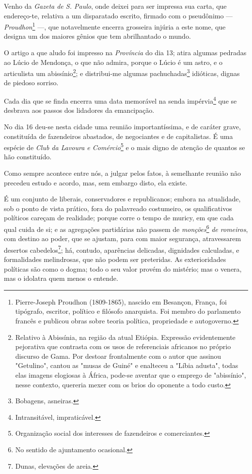 Venho da \emph{Gazeta de S. Paulo}, onde deixei para ser impressa sua
carta, que endereço-te, relativa a um disparatado escrito, firmado com o
pseudônimo --- \emph{Proudhon}\footnote{Pierre-Joseph Proudhon
  (1809-1865), nascido em Besançon, França, foi tipógrafo, escritor,
  político e filósofo anarquista. Foi membro do parlamento francês e
  publicou obras sobre teoria política, propriedade e autogoverno.}
---, que notavelmente encerra grosseira injúria a este nome, que
designa um dos maiores gênios que tem abrilhantado o mundo.

O artigo a que aludo foi impresso na \emph{Província} do dia 13; atira
algumas pedradas ao Lúcio de Mendonça, o que não admira, porque o Lúcio
é um astro, e o articulista um abissínio\footnote{Relativo à
  Abissínia, na região da atual Etiópia. Expressão evidentemente
  pejorativa que contrasta com os usos de referenciais africanos no
  próprio discurso de Gama. Por destoar frontalmente com o autor que
  assinou "Getulino", cantou as "musas de Guiné" e enalteceu a "Líbia
  adusta", todas elas imagens elogiosas à África, pode-se aventar que o
  emprego de "abissínio", nesse contexto, quereria mexer com os brios do
  oponente a todo custo.}; e distribui-me algumas pachuchadas\footnote{
  Bobagens, asneiras.} idióticas, dignas de piedoso sorriso.

Cada dia que se finda encerra uma data memorável na senda
impérvia\footnote{Intransitável, impraticável.} que se desbrava aos
passos dos lidadores da emancipação.

No dia 16 deu-se nesta cidade uma reunião importantíssima, e de caráter
grave, constituída de fazendeiros abastados, de negociantes e de
capitalistas. É uma espécie de \emph{Club da Lavoura e
Comércio}\footnote{Organização social dos interesses de fazendeiros e
  comerciantes.} e o mais digno de atenção de quantos se hão
constituído.

Como sempre acontece entre nós, a julgar pelos fatos, à semelhante
reunião não precedeu estudo e acordo, mas, sem embargo disto, ela
existe.

É um conjunto de liberais, conservadores e republicanos; embora na
atualidade, sob o ponto de vista prático, fora do palavreado costumeiro,
os qualificativos políticos careçam de realidade; porque corre o tempo
de muricy, em que cada qual cuida de si; e as agregações partidárias não
passem de \emph{monções}\footnote{No sentido de ajuntamento ocasional.}
\emph{de romeiros}, com destino ao poder, que se ajustam, para com maior
segurança, atravessarem desertos cabedelos\footnote{Dunas, elevações
  de areia.}; há, contudo, aparências delicadas, dignidades calculadas,
e formalidades melindrosas, que não podem ser preteridas. As
exterioridades políticas são como o dogma; todo o seu valor provém do
mistério; mas o venera, mas o idolatra quem menos o entende.

